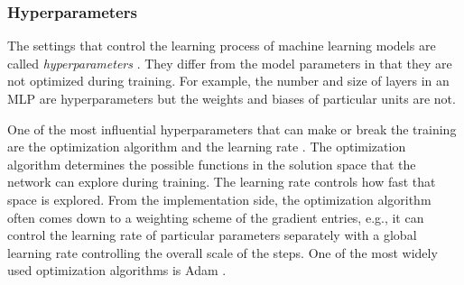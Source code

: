 





\subsubsection{Hyperparameters}

The settings that control the learning process of machine learning models are called \emph{hyperparameters} \cite{Goodfellow-et-al-2016}. They differ from the model parameters in that they are not optimized during training. For example, the number and size of layers in an \ac{MLP} are hyperparameters but the weights and biases of particular units are not.

One of the most influential hyperparameters that can make or break the training are the optimization algorithm and the learning rate \cite{Goodfellow-et-al-2016,Bengio2012}. The optimization algorithm determines the possible functions in the solution space that the network can explore during training. The learning rate controls how fast that space is explored. From the implementation side, the optimization algorithm often comes down to a weighting scheme of the gradient entries, e.g., it can control the learning rate of particular parameters separately with a global learning rate controlling the overall scale of the steps. One of the most widely used optimization algorithms is Adam \cite{Kingma2017}.

